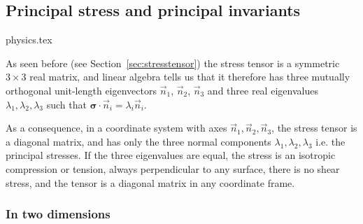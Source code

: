 

\newpage
\subsection{Principal stress and principal invariants} \label{sec:princ_stress}
\begin{flushright} {\tiny {\color{gray} physics.tex}} \end{flushright}


As seen before (see Section~\ref{sec:stresstensor}) 
the stress tensor is a symmetric $3\times3$ real matrix, and linear algebra tells us that it 
therefore has three mutually orthogonal unit-length eigenvectors $\vec{n}_{1}$, $\vec{n}_{2}$, 
$\vec{n}_{3}$ and three real eigenvalues $\lambda _{1},\lambda _{2},\lambda _{3}$ 
such that ${\bm \sigma}\!\cdot\! \vec{n}_i=\lambda_{i} \vec{n}_{i}$.

As a consequence, in a coordinate system with axes $\vec{n}_{1},\vec{n}_{2},\vec{n}_{3}$, 
the stress tensor is a diagonal matrix, and has only the three normal components $\lambda _{1},\lambda _{2},\lambda _{3}$
i.e. the principal stresses. If the three eigenvalues are equal, the stress is an isotropic compression or tension, always perpendicular to any surface, there is no shear stress, and the tensor is a diagonal matrix in any coordinate frame.

\subsubsection{In two dimensions}

